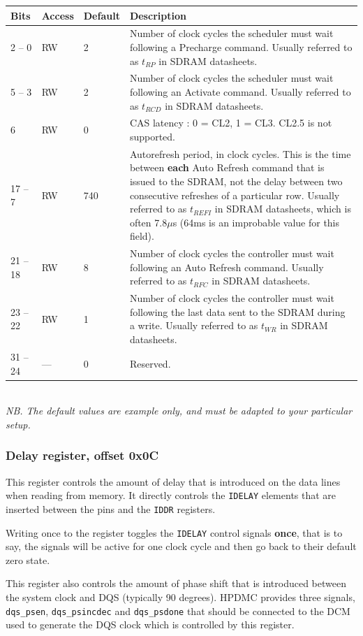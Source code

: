 \documentclass[a4paper,11pt]{article}
\begin{document}
\begin{tabular}{|p{1.5cm}|l|l|p{10cm}|}
\hline
\bf Bits & \bf Access & \bf Default & \bf Description \\
\hline
2 -- 0 & RW & 2 & Number of clock cycles the scheduler must wait following a Precharge command. Usually referred to as $t_{RP}$ in SDRAM datasheets. \\
\hline
5 -- 3 & RW & 2 & Number of clock cycles the scheduler must wait following an Activate command. Usually referred to as $t_{RCD}$ in SDRAM datasheets. \\
\hline
6 & RW & 0 & CAS latency : 0 = CL2, 1 = CL3. CL2.5 is not supported. \\
\hline
17 -- 7 & RW & 740 & Autorefresh period, in clock cycles. This is the time between \textbf{each} Auto Refresh command that is issued to the SDRAM, not the delay between two consecutive refreshes of a particular row. Usually referred to as $t_{REFI}$ in SDRAM datasheets, which is often  7.8$\mu$s  (64ms is an improbable value for this field). \\
\hline
21 -- 18 & RW & 8 & Number of clock cycles the controller must wait following an Auto Refresh command. Usually referred to as $t_{RFC}$ in SDRAM datasheets. \\
\hline
23 -- 22 & RW & 1 & Number of clock cycles the controller must wait following the last data sent to the SDRAM during a write. Usually referred to as $t_{WR}$ in SDRAM datasheets. \\
\hline
31 -- 24 & --- & 0 & Reserved. \\
\hline
\end{tabular}\\

\textit{NB. The default values are example only, and must be adapted to your particular setup.}

\subsubsection{Delay register, offset 0x0C}
This register controls the amount of delay that is introduced on the data lines when reading from memory. It directly controls the \verb!IDELAY! elements that are inserted between the pins and the \verb!IDDR! registers.

Writing once to the register toggles the \verb!IDELAY! control signals \textbf{once}, that is to say, the signals will be active for one clock cycle and then go back to their default zero state.

This register also controls the amount of phase shift that is introduced between the system clock and DQS (typically 90 degrees). HPDMC provides three signals, \verb!dqs_psen!, \verb!dqs_psincdec! and \verb!dqs_psdone! that should be connected to the DCM used to generate the DQS clock which is controlled by this register.
\end{document}

